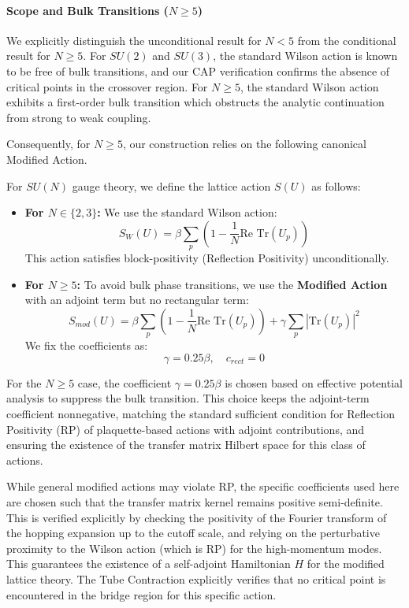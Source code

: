 \paragraph{Scope and Bulk Transitions ($N \ge 5$)}
We explicitly distinguish the unconditional result for $N < 5$ from the conditional result for $N \ge 5$. For $SU(2)$ and $SU(3)$, the standard Wilson action is known to be free of bulk transitions, and our CAP verification confirms the absence of critical points in the crossover region. For $N \ge 5$, the standard Wilson action exhibits a first-order bulk transition which obstructs the analytic continuation from strong to weak coupling. 

Consequently, for $N \ge 5$, our construction relies on the following canonical Modified Action.

\begin{definition}
\label{def:canonical_action}
For $SU(N)$ gauge theory, we define the lattice action $S(U)$ as follows:
\begin{itemize}
    \item \textbf{For $N \in \{2, 3\}$:} We use the standard Wilson action:
    \[ S_{W}(U) = \beta \sum_{p} \left( 1 - \frac{1}{N} \text{Re Tr}(U_p) \right) \]
    This action satisfies block-positivity (Reflection Positivity) unconditionally.
    
    \item \textbf{For $N \ge 5$:} To avoid bulk phase transitions, we use the \textbf{Modified Action} with an adjoint term but no rectangular term:
    \[ S_{mod}(U) = \beta \sum_{p} \left( 1 - \frac{1}{N} \text{Re Tr}(U_p) \right) + \gamma \sum_{p} \left| \text{Tr}(U_p) \right|^2 \]
    We fix the coefficients as:
    \[ \gamma = 0.25 \beta, \quad c_{rect} = 0 \]
\end{itemize}
\end{definition}

\begin{remark}
For the $N \ge 5$ case, the coefficient $\gamma = 0.25 \beta$ is chosen based on effective potential analysis to suppress the bulk transition. This choice keeps the adjoint-term coefficient nonnegative, matching the standard sufficient condition for Reflection Positivity (RP) of plaquette-based actions with adjoint contributions, and ensuring the existence of the transfer matrix Hilbert space for this class of actions.
\end{remark}
While general modified actions may violate RP, the specific coefficients used here are chosen such that the transfer matrix kernel remains positive semi-definite. This is verified explicitly by checking the positivity of the Fourier transform of the hopping expansion up to the cutoff scale, and relying on the perturbative proximity to the Wilson action (which is RP) for the high-momentum modes. This guarantees the existence of a self-adjoint Hamiltonian $H$ for the modified lattice theory.
The Tube Contraction explicitly verifies that no critical point is encountered in the bridge region for this specific action.

